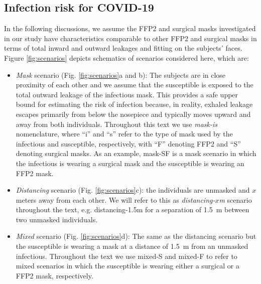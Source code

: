\documentclass[preprint]{elsarticle}
\begin{document}
\subsection{Infection risk for COVID-19}
In the following discussions, we assume the FFP2 and surgical masks investigated in our study have characteristics comparable to other FFP2 and surgical masks in terms of total inward and outward leakages and fitting on the subjects' faces. Figure \ref{fig:scenarios} depicts schematics of scenarios considered here, which are:
\begin{itemize}
    \item \emph{Mask} scenario (Fig. \ref{fig:scenarios}a and b): The subjects are in close proximity of each other and we assume that the susceptible is exposed to the total outward leakage of the infectious mask. This provides a safe upper bound for estimating the risk of infection because, in reality, exhaled leakage escapes primarily from below the nosepiece and typically moves upward and away from both individuals. Throughout this text we use \emph{mask-is} nomenclature, where \enquote{i} and \enquote{s} refer to the type of mask used by the infectious and susceptible, respectively, with \enquote{F} denoting FFP2 and \enquote{S} denoting surgical masks. As an example, mask-SF is a mask scenario in which the infectious is wearing a surgical mask and the susceptible is wearing an FFP2 mask.
    \item \emph{Distancing} scenario (Fig. \ref{fig:scenarios}c): the individuals are unmasked and $x$ meters away from each other. We will refer to this as \emph{distancing-$x$m} scenario throughout the text, e.g. distancing-1.5m for a separation of \SI{1.5}{\meter} between two unmasked individuals.
    \item \emph{Mixed} scenario (Fig. \ref{fig:scenarios}d): The same as the distancing scenario but the susceptible is wearing a mask at a distance of \SI{1.5}{\meter} from an unmasked infectious. Throughout the text we use mixed-S and mixed-F to refer to mixed scenarios in which the susceptible is wearing either a surgical or a FFP2 mask, respectively. 
\end{itemize}
\end{document}
